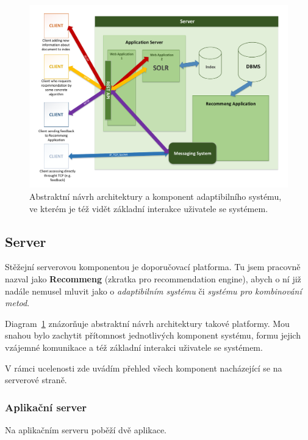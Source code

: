 \documentclass[thesis=M,czech]{FITthesis}[2014/05/07]
\begin{document}
\begin{figure}\centering
	\includegraphics[width=1.0\textwidth]{obr/DIPLOMKA_env.pdf}
 	\caption[Abstraktní návrh architektury a komponent adaptibilního systému]{Abstraktní návrh architektury a komponent adaptibilního systému, ve kterém je též vidět základní interakce uživatele se systémem.}\label{fig:recommeng}
\end{figure}	

\subsection{Server}

Stěžejní serverovou komponentou je doporučovací platforma. Tu jsem pracovně nazval jako \textbf{Recommeng} (zkratka pro recommendation engine), abych o ní již nadále nemusel mluvit jako o \emph{adaptibilním systému} či \emph{systému pro kombinování metod}. 

Diagram~\ref{fig:recommeng} znázorňuje abstraktní návrh architektury takové platformy. Mou snahou bylo zachytit přítomnost jednotlivých komponent systému, formu jejich vzájemné komunikace a též základní interakci uživatele se systémem.

V rámci ucelenosti zde uvádím přehled všech komponent nacházející se na serverové straně.

\subsubsection{Aplikační server}

Na aplikačním serveru poběží dvě aplikace. 
\end{document}
